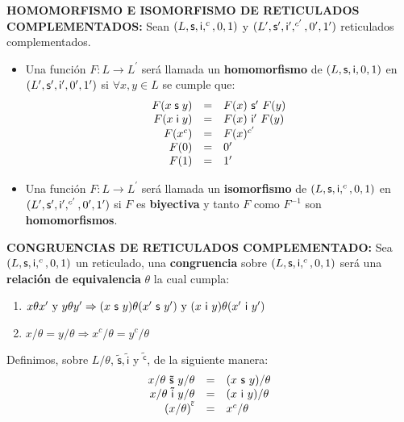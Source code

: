  \vspace{3mm}
  \PN \textbf{HOMOMORFISMO E ISOMORFISMO DE RETICULADOS COMPLEMENTADOS:} Sean $(L, \mathsf{s}, \mathsf{i}, ^{c}, 0, 1)$ y
  $(L^{\prime}, \mathsf{s}^{\prime}, \mathsf{i}^{\prime}, ^{c^{\prime}}, 0^{\prime}, 1^{\prime})$ reticulados complementados.
  \begin{itemize}
    \item Una función $F: L \rightarrow L^{\prime}$ será llamada un \textbf{homomorfismo} de $(L, \mathsf{s}, \mathsf{i}, 0, 1)$ en
      $(L^{\prime}, \mathsf{s}^{\prime}, \mathsf{i}^{\prime}, 0^{\prime}, 1^{\prime})$ si $\forall x, y \in L$ se cumple que:
      \[
        \begin{array}{rcl}
          F(x \mathsf{\;s\;} y) &=& F(x) \ \mathsf{s}^{\prime} \ F(y) \\
          F(x \mathsf{\;i\;} y) &=& F(x) \ \mathsf{i}^{\prime} \ F(y) \\
          F(x^{c}) &=& F(x)^{c^{\prime}} \\
          F(0) &=& 0^{\prime} \\
          F(1) &=& 1^{\prime}
        \end{array}
      \]
    \item Una función $F: L \rightarrow L^{\prime}$ será llamada un \textbf{isomorfismo} de $(L, \mathsf{s}, \mathsf{i}, ^{c}, 0, 1)$
      en $(L^{\prime}, \mathsf{s}^{\prime}, \mathsf{i}^{\prime}, ^{c^{\prime}}, 0^{\prime}, 1^{\prime})$ si $F$ es \textbf{biyectiva}
      y tanto $F$ como $F^{-1}$ son \textbf{homomorfismos}.
  \end{itemize}

  \vspace{3mm}
  \PN \textbf{CONGRUENCIAS DE RETICULADOS COMPLEMENTADO:} Sea $(L, \mathsf{s}, \mathsf{i}, ^{c}, 0, 1)$ un reticulado, una
  \textbf{congruencia} sobre $(L, \mathsf{s}, \mathsf{i}, ^{c}, 0, 1)$ será una \textbf{relación de equivalencia} $\theta$ la cual
  cumpla:
  \begin{enumerate}
    \item $x \theta x^{\prime} \text{ y } y \theta y^{\prime} \Rightarrow (x \ \SU \ y) \theta (x^{\prime} \ \SU \
      y^{\prime}) \text{ y } (x \ \IN \ y) \theta (x^{\prime} \ \IN \ y^{\prime})$
    \item $x/\theta = y/\theta \Rightarrow x^{c}/\theta = y^{c}/\theta$
  \end{enumerate}

  \PN Definimos, sobre $L/\theta$, $\mathsf{\tilde{s}}, \mathsf{\tilde{i}}$ y $\mathsf{\tilde{^{c}}}$, de la siguiente
  manera:
  \[
    \begin{array}{rcl}
      x/\theta \ \mathsf{\tilde{s}} \ y/\theta &=& (x \ \SU \ y)/\theta \\
      x/\theta \ \mathsf{\tilde{i}} \ y/\theta &=& (x \ \IN \ y)/\theta \\
      (x/\theta)^{\mathsf{\tilde{^{c}}}} &=& x^{c}/\theta \\
    \end{array}
  \]

